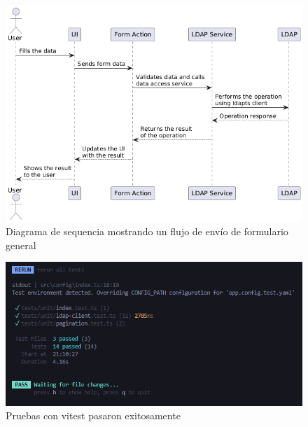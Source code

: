 \begin{figure}[H]
    \centering
    \includegraphics[width=\linewidth]{images/puml/sequence diagram form submission/sequence diagram form submission.png}
    \caption{Diagrama de sequencia mostrando un flujo de envío de formulario general}
    \label{fig:general-form-submission-diagram}
\end{figure}

\newpage
\begin{figure}[H]
    \centering
    \includegraphics[width=\linewidth]{images/vitest tests run successfully.png}
    \caption{Pruebas con vitest pasaron exitosamente}
    \label{fig:integration-tests-run-ok}
\end{figure}

